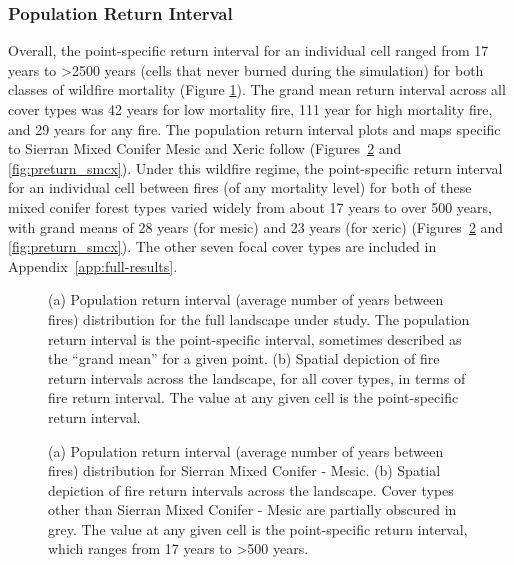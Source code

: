 \subsubsection{Population Return Interval}
Overall, the point-specific return interval for an individual cell ranged from 17 years to \textgreater 2500 years (cells that never burned during the simulation) for both classes of wildfire mortality (Figure \ref{fig:preturn}). The grand mean return interval across all cover types was 42 years for low mortality fire, 111 year for high mortality fire, and 29 years for any fire. The population return interval plots and maps specific to Sierran Mixed Conifer Mesic and Xeric follow (Figures~\ref{fig:preturn_smcm} and \ref{fig:preturn_smcx}). Under this wildfire regime, the point-specific return interval for an individual cell between fires (of any mortality level) for both of these mixed conifer forest types varied widely from about 17 years to over 500 years, with grand means of 28 years (for mesic) and 23 years (for xeric) (Figures~\ref{fig:preturn_smcm} and \ref{fig:preturn_smcx}). The other seven focal cover types are included in Appendix~\ref{app:full-results}. 




\begin{figure}[!htbp]
  \centering
  \qquad
  \caption{(a) Population return interval (average number of years between fires) distribution for the full landscape under study. The population return interval is the point-specific interval, sometimes described as the ``grand mean'' for a given point. (b) Spatial depiction of fire return intervals across the landscape, for all cover types, in terms of fire return interval. The value at any given cell is the point-specific return interval.}
  \label{fig:preturn}
\end{figure}

\begin{figure}[!htbp]
  \centering
  \caption{(a) Population return interval (average number of years between fires) distribution for Sierran Mixed Conifer - Mesic.  (b) Spatial depiction of fire return intervals across the landscape. Cover types other than Sierran Mixed Conifer - Mesic are partially obscured in grey. The value at any given cell is the point-specific return interval, which ranges from 17 years to \textgreater 500 years.}
\label{fig:preturn_smcm}
\end{figure}

